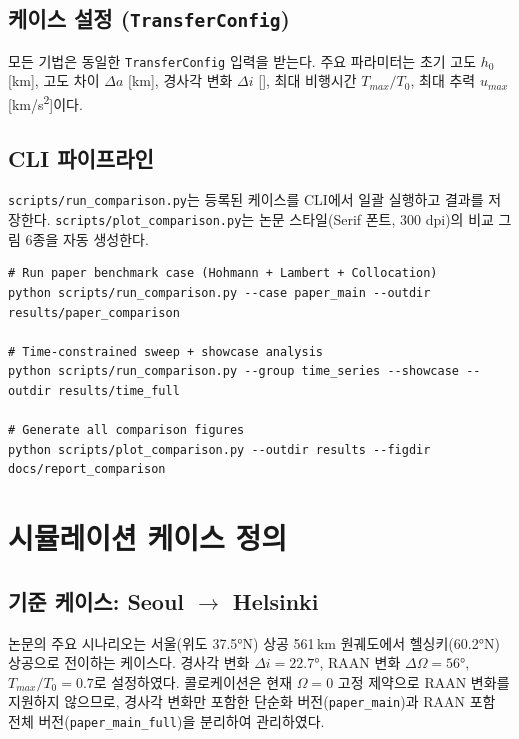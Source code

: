 \documentclass[11pt]{article}
\begin{document}
\subsection{케이스 설정 (\texttt{TransferConfig})}

모든 기법은 동일한 \texttt{TransferConfig} 입력을 받는다.
주요 파라미터는 초기 고도 $h_0$ [km], 고도 차이 $\Delta a$ [km], 경사각 변화 $\Delta i$ [\degree], 최대 비행시간 $T_{max}/T_0$, 최대 추력 $u_{max}$ [km/s\textsuperscript{2}]이다.

\subsection{CLI 파이프라인}

\texttt{scripts/run\_comparison.py}는 등록된 케이스를 CLI에서 일괄 실행하고 결과를 저장한다.
\texttt{scripts/plot\_comparison.py}는 논문 스타일(Serif 폰트, 300 dpi)의 비교 그림 6종을 자동 생성한다.

\begin{lstlisting}
# Run paper benchmark case (Hohmann + Lambert + Collocation)
python scripts/run_comparison.py --case paper_main --outdir results/paper_comparison

# Time-constrained sweep + showcase analysis
python scripts/run_comparison.py --group time_series --showcase --outdir results/time_full

# Generate all comparison figures
python scripts/plot_comparison.py --outdir results --figdir docs/report_comparison
\end{lstlisting}


\section{시뮬레이션 케이스 정의}

\subsection{기준 케이스: Seoul $\to$ Helsinki}

논문의 주요 시나리오는 서울(위도 37.5°N) 상공 561\,km 원궤도에서 헬싱키(60.2°N) 상공으로 전이하는 케이스다.
경사각 변화 $\Delta i = 22.7°$, RAAN 변화 $\Delta\Omega = 56°$, $T_{max}/T_0 = 0.7$로 설정하였다.
콜로케이션은 현재 $\Omega = 0$ 고정 제약으로 RAAN 변화를 지원하지 않으므로, 경사각 변화만 포함한 단순화 버전(\texttt{paper\_main})과 RAAN 포함 전체 버전(\texttt{paper\_main\_full})을 분리하여 관리하였다.
\end{document}
